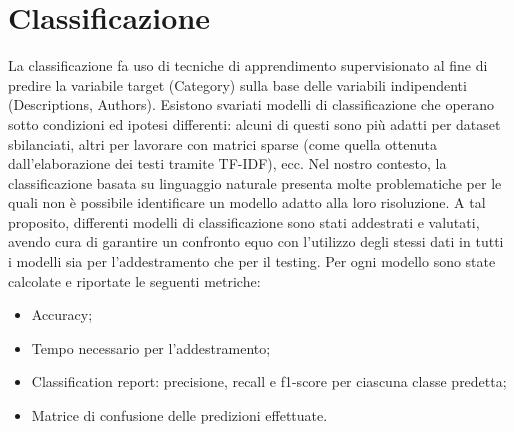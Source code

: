 \documentclass[12pt,oneside]{article}
\begin{document}
\section{Classificazione}
    \begin{justify}
        La classificazione fa uso di tecniche di apprendimento supervisionato al fine di predire la variabile target (Category) sulla base delle variabili indipendenti (Descriptions, Authors).
        Esistono svariati modelli di classificazione che operano sotto condizioni ed ipotesi differenti: alcuni di questi sono più adatti per dataset sbilanciati, altri per lavorare con matrici sparse (come quella ottenuta dall’elaborazione dei testi tramite TF-IDF), ecc. Nel nostro contesto, la classificazione basata su linguaggio naturale presenta molte problematiche per le quali non è possibile identificare un modello adatto alla loro risoluzione. A tal proposito, differenti modelli di classificazione sono stati addestrati e valutati, avendo cura di garantire un confronto equo con l'utilizzo degli stessi dati in tutti i modelli sia per l’addestramento che per il testing.
        Per ogni modello sono state calcolate e riportate le seguenti metriche:
        \begin{itemize}
            \item Accuracy;
            \item Tempo necessario per l’addestramento;
            \item Classification report: precisione, recall e f1-score per ciascuna classe predetta;
            \item Matrice di confusione delle predizioni effettuate.
        \end{itemize}
    \end{justify}
\end{document}
